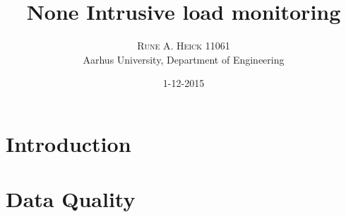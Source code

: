 


\title{\vspace{-15mm}\fontsize{24pt}{10pt}\selectfont\textbf{None Intrusive load monitoring}} %

\author{
\large
\textsc{Rune A. Heick 11061}\\[2mm] %
\normalsize Aarhus University, Department of Engineering \\ %
\vspace{-5mm}
}
\date{1-12-2015}


\setlength{\abovedisplayskip}{1cm}
\setlength{\belowdisplayskip}{.8cm}
\maketitle %

\newpage

\begin{abstract}
\lipsum[7] %
\end{abstract}

\newpage

\tableofcontents


\chapter{Introduction}
\lipsum[1] %
\newpage
\newpage
\chapter{Data Quality}
\lipsum[2] %
\lipsum[2] %
\lipsum[2] %
\lipsum[2] %
\lipsum[2] %
\lipsum[2] %
\lipsum[2] %
\lipsum[2] %
\lipsum[2] %
\lipsum[2] %
\lipsum[2] %
